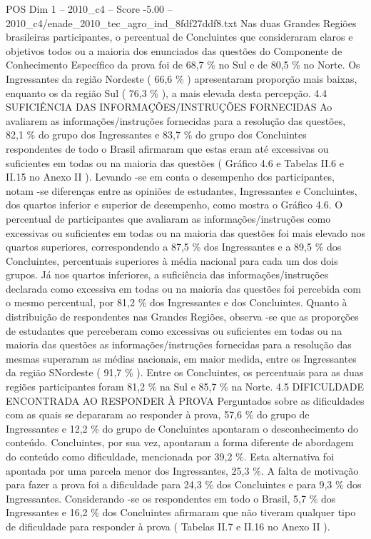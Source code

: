 \begin{textsample}{POS Dim 1 – 2010\_c4 – Score -5.00 – 2010\_c4/enade\_2010\_tec\_agro\_ind\_8fdf27ddf8.txt}
Nas duas Grandes Regiões brasileiras participantes, o percentual de Concluintes que consideraram claros e objetivos todos ou a maioria dos enunciados das questões do Componente de Conhecimento Específico da prova foi de 68,7 \% no Sul e de 80,5 \% no Norte.
Os Ingressantes da região Nordeste ( 66,6 \% ) apresentaram proporção mais baixas, enquanto os da região Sul ( 76,3 \% ), a mais elevada desta percepção. 4.4 SUFICIÊNCIA DAS INFORMAÇÕES/INSTRUÇÕES FORNECIDAS Ao avaliarem as informações/instruções fornecidas para a resolução das questões, 82,1 \% do grupo dos Ingressantes e 83,7 \% do grupo dos Concluintes respondentes de todo o Brasil afirmaram que estas eram até excessivas ou suficientes em todas ou na maioria das questões ( Gráfico 4.6 e Tabelas II.6 e II.15 no Anexo II ).
Levando -se em conta o desempenho dos participantes, notam -se diferenças entre as opiniões de estudantes, Ingressantes e Concluintes, dos quartos inferior e superior de desempenho, como mostra o Gráfico 4.6.
O percentual de participantes que avaliaram as informações/instruções como excessivas ou suficientes em todas ou na maioria das questões foi mais elevado nos quartos superiores, correspondendo a 87,5 \% dos Ingressantes e a 89,5 \% dos Concluintes, percentuais superiores à média nacional para cada um dos dois grupos.
Já nos quartos inferiores, a suficiência das informações/instruções declarada como excessiva em todas ou na maioria das questões foi percebida com o mesmo percentual, por 81,2 \% dos Ingressantes e dos Concluintes.
Quanto à distribuição de respondentes nas Grandes Regiões, observa -se que as proporções de estudantes que perceberam como excessivas ou suficientes em todas ou na maioria das questões as informações/instruções fornecidas para a resolução das mesmas superaram as médias nacionais, em maior medida, entre os Ingressantes da região SNordeste ( 91,7 \% ).
Entre os Concluintes, os percentuais para as duas regiões participantes foram 81,2 \% na Sul e 85,7 \% na Norte. 4.5 DIFICULDADE ENCONTRADA AO RESPONDER À PROVA Perguntados sobre as dificuldades com as quais se depararam ao responder à prova, 57,6 \% do grupo de Ingressantes e 12,2 \% do grupo de Concluintes apontaram o desconhecimento do conteúdo.
Concluintes, por sua vez, apontaram a forma diferente de abordagem do conteúdo como dificuldade, mencionada por 39,2 \%.
Esta alternativa foi apontada por uma parcela menor dos Ingressantes, 25,3 \%.
A falta de motivação para fazer a prova foi a dificuldade para 24,3 \% dos Concluintes e para 9,3 \% dos Ingressantes.
Considerando -se os respondentes em todo o Brasil, 5,7 \% dos Ingressantes e 16,2 \% dos Concluintes afirmaram que não tiveram qualquer tipo de dificuldade para responder à prova ( Tabelas II.7 e II.16 no Anexo II ).

\end{textsample}
